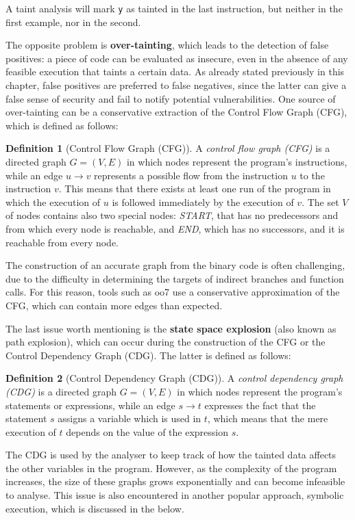 \documentclass[12pt,a4paper]{book}
\theoremstyle{definition}
\newtheorem{defn}{Definition}
\begin{document}
	A taint analysis will mark \texttt{y} as tainted in the last instruction, but neither in the first example, nor in the second.
	
	The opposite problem is \textbf{over-tainting}, which leads to the detection of false positives: a piece of code can be evaluated as insecure, even in the absence of any feasible execution that taints a certain data. As already stated previously in this chapter, false positives are preferred to false negatives, since the latter can give a false sense of security and fail to notify potential vulnerabilities. One source of over-tainting can be a conservative extraction of the Control Flow Graph (CFG), which is defined as follows:
	\begin{defn}[Control Flow Graph (CFG)]
		A \textit{control flow graph (CFG)} is a directed graph $G=(V,E)$ in which nodes represent the program's instructions, while an edge $u \rightarrow v$ represents a possible flow from the instruction $u$ to the instruction $v$. This means that there exists at least one run of the program in which the execution of $u$ is followed immediately by the execution of $v$. The set $V$ of nodes contains also two special nodes: \textit{START}, that has no predecessors and from which every node is reachable, and \textit{END}, which has no successors, and it is reachable from every node.
	\end{defn}
	
	The construction of an accurate graph from the binary code is often challenging, due to the difficulty in determining the targets of indirect branches and function calls. For this reason, tools such as oo7 \cite{Wang2019} use a conservative approximation of the CFG, which can contain more edges than expected.
	
	The last issue worth mentioning is the \textbf{state space explosion} (also known as path explosion), which can occur during the construction of the CFG or the Control Dependency Graph (CDG). The latter is defined as follows:
	
	\begin{defn}[Control Dependency Graph (CDG)]
		A \textit{control dependency graph (CDG)} \cite{Krinke2007} is a directed graph $G=(V,E)$ in which nodes represent the program's statements or expressions, while an edge $s\rightarrow t$ expresses the fact that the statement $s$ assigns a variable which is used in $t$, which means that the mere execution of $t$ depends on the value of the expression $s$. 
	\end{defn}
	The CDG is used by the analyser to keep track of how the tainted data affects the other variables in the program. However, as the complexity of the program increases, the size of these graphs grows exponentially and can become infeasible to analyse. This issue is also encountered in another popular approach, symbolic execution, which is discussed in the below. 
\end{document}
